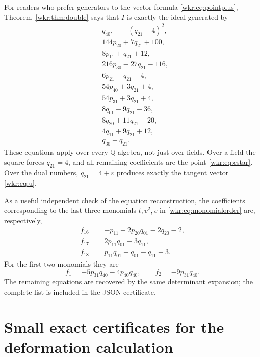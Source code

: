 \documentclass[11pt,a4paper]{article}
\numberwithin{equation}{section}
\theoremstyle{definition}
\theoremstyle{remark}
\newcommand{\Q}{\mathbb{Q}}
\newcommand{\eps}{\varepsilon}
\begin{document}
For readers who prefer generators to the vector formula
\eqref{wkr:eq:pointplus}, Theorem~\ref{wkr:thm:double} says that $I$ is exactly
the ideal generated by
\begin{equation}\label{wkr:eq:idealexplicit}
\begin{aligned}
&q_{40},\qquad (q_{21}-4)^2,\\
&144p_{20}+7q_{21}+100,\\
&8p_{11}+q_{21}+12,\\
&216p_{30}-27q_{21}-116,\\
&6p_{21}-q_{21}-4,\\
&54p_{40}+3q_{21}+4,\\
&54p_{31}+3q_{21}+4,\\
&8q_{01}-9q_{21}-36,\\
&8q_{20}+11q_{21}+20,\\
&4q_{11}+9q_{21}+12,\\
&q_{30}-q_{21}.
\end{aligned}
\end{equation}
These equations apply over every $\Q$-algebra, not just over fields.
Over a field the square forces $q_{21}=4$, and all remaining coefficients
are the point \eqref{wkr:eq:cstar}. Over the dual numbers, $q_{21}=4+\eps$
produces exactly the tangent vector \eqref{wkr:eq:u}.

As a useful independent check of the equation reconstruction, the
coefficients corresponding to the last three monomials $t,v^2,v$ in
\eqref{wkr:eq:monomialorder} are, respectively,
\begin{align*}
f_{16}&=-p_{11}+2p_{20}q_{01}-2q_{20}-2,\\
f_{17}&=2p_{11}q_{01}-3q_{11},\\
f_{18}&=p_{11}q_{01}+q_{01}-q_{11}-3.
\end{align*}
For the first two monomials they are
\[
f_1=-5p_{31}q_{40}-4p_{40}q_{40},\qquad
f_2=-9p_{31}q_{40}.
\]
The remaining equations are recovered by the same determinant expansion;
the complete list is included in the JSON certificate.

\section{Small exact certificates for the deformation calculation}
\label{wkr:app:certificates}
\end{document}
